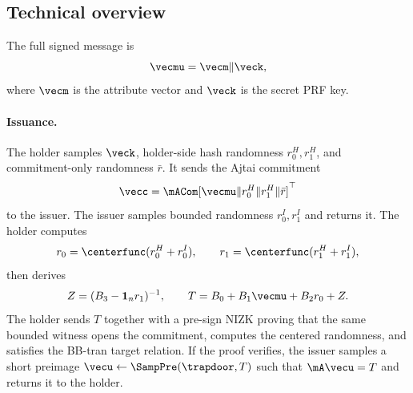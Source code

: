 \subsection{Technical overview}
The full signed message is
\[
  \vecmu=\vecm\Vert\veck,
\]
where $\vecm$ is the attribute vector and $\veck$ is the secret PRF key.

\paragraph*{Issuance.}
The holder samples $\veck$, holder-side hash randomness $r_0^H,r_1^H$, and commitment-only randomness
$\bar r$.  It sends the Ajtai commitment
\[
  \vecc=\mACom[\vecmu\Vert r_0^H\Vert r_1^H\Vert \bar r]^\top
\]
to the issuer.  The issuer samples bounded randomness $r_0^I,r_1^I$ and returns it.  The holder computes
\[
  r_0=\centerfunc(r_0^H+r_0^I),\qquad
  r_1=\centerfunc(r_1^H+r_1^I),
\]
then derives
\[
  Z=(B_3-\mathbf 1_n r_1)^{-1},\qquad
  T=B_0+B_1\vecmu+B_2r_0+Z.
\]
The holder sends $T$ together with a pre-sign NIZK proving that the same bounded witness opens the
commitment, computes the centered randomness, and satisfies the BB-tran target relation.  If the proof
verifies, the issuer samples a short preimage $\vecu\gets\SampPre(\trapdoor,T)$ such that $\mA\vecu=T$ and
returns it to the holder.

